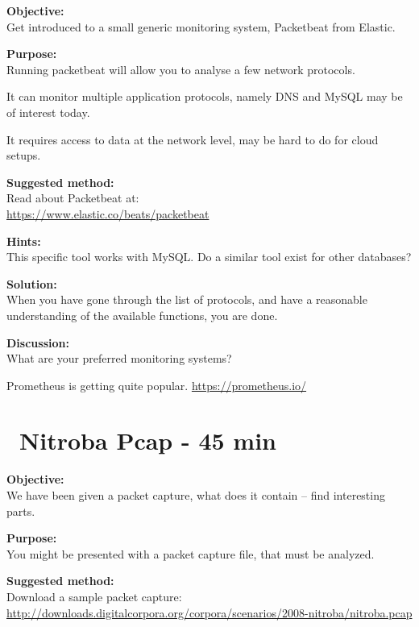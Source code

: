 \documentclass[a4paper,11pt,notitlepage]{report}
\begin{document}

{\bf Objective:}\\
Get introduced to a small generic monitoring system, Packetbeat from Elastic.


{\bf Purpose:}\\
Running packetbeat will allow you to analyse a few network protocols.

It can monitor multiple application protocols, namely DNS and MySQL may be of interest today.

It requires access to data at the network level, may be hard to do for cloud setups.

{\bf Suggested method:}\\
Read about Packetbeat at:\\
\url{https://www.elastic.co/beats/packetbeat}

{\bf Hints:}\\
This specific tool works with MySQL. Do a similar tool exist for other databases?


{\bf Solution:}\\
When you have gone through the list of protocols, and have a reasonable understanding of the available functions, you are done.

{\bf Discussion:}\\
What are your preferred monitoring systems?

Prometheus is getting quite popular.
\url{https://prometheus.io/}





\chapter{\faExclamationTriangle\ Nitroba Pcap -  45 min}
\label{ex:nitroba-pcap}


{\bf Objective:}\\
We have been given a packet capture, what does it contain -- find interesting parts.

{\bf Purpose:}\\
You might be presented with a packet capture file, that must be analyzed.

{\bf Suggested method:}\\
Download a sample packet capture:\\
\url{http://downloads.digitalcorpora.org/corpora/scenarios/2008-nitroba/nitroba.pcap}
\end{document}
